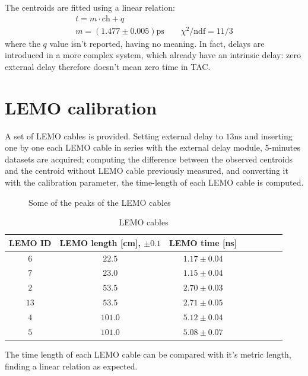 \documentclass[11pt,a4 paper]{article}
\begin{document}
The centroids are fitted using a linear relation:
\begin{gather*}
    t = m\cdot \text{ch} + q \\
    m = (1.477 \pm 0.005) \si{\pico\second} \qquad
    \chi^2/\text{ndf} = 11/3
\end{gather*}
where the $q$ value isn't reported, having no meaning. In fact, delays are introduced in a more complex system, which already have an intrinsic delay: zero external delay therefore doesn't mean zero time in TAC.



\section{LEMO calibration}
A set of LEMO cables is provided. Setting external delay to $13\si{\nano\second}$ and inserting one by one each LEMO cable in series with the external delay module, 5-minutes datasets are acquired; computing the difference between the observed centroids and the centroid without LEMO cable previously measured, and converting it with the calibration parameter, the time-length of each LEMO cable is computed.

\begin{figure}[H]
    \centering
    \caption{Some of the peaks of the LEMO cables}
    \label{fig:lemo}
\end{figure}

\begin{table}[H]
    \centering
    \begin{tabular}{cccccccc}
        \toprule
        LEMO ID & LEMO length [cm], $\pm 0.1$ & LEMO time [ns]\\
        \midrule
        $6$ & $22.5$ & $1.17\pm0.04$\\
        $7$ & $23.0$ & $1.15\pm0.04$\\
        $2$ & $53.5$ & $2.70\pm0.03$\\
        $13$ & $53.5$ & $2.71\pm0.05$\\
        $4$ & $101.0$ & $5.12\pm0.04$\\
        $5$ & $101.0$ & $5.08\pm0.07$\\
        \bottomrule
    \end{tabular}
    \caption{LEMO cables}
    \label{tab:lemo}
\end{table}

The time length of each LEMO cable can be compared with it's metric length, finding a linear relation as expected.
\end{document}
